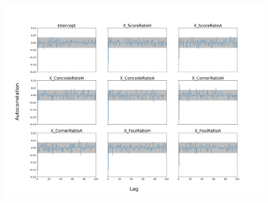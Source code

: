\documentclass[9pt]{IEEEtran}
\begin{document}
\begin{figure}[h]
\centering
\includegraphics[width=1\columnwidth]{figures/autocorr.png}
\caption{}
\label{fig:autocorr}
\end{figure}








\end{document}
